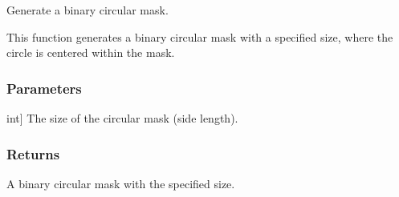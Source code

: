 \documentclass[letterpaper,10pt,english]{sphinxmanual}
\begin{document}

\begin{fulllineitems}
\label{\detokenize{pycatch/utils/ch_mapping:pycatch.utils.ch_mapping.make_circle}}
\pysigstartsignatures
{}
\pysigstopsignatures
\sphinxAtStartPar
Generate a binary circular mask.

\sphinxAtStartPar
This function generates a binary circular mask with a specified size, where the circle is centered within the mask.


\subsubsection{Parameters}
\label{\detokenize{pycatch/utils/ch_mapping:id23}}\begin{description}
\sphinxlineitem{s}{[}int{]}
\sphinxAtStartPar
The size of the circular mask (side length).

\end{description}


\subsubsection{Returns}
\label{\detokenize{pycatch/utils/ch_mapping:id24}}\begin{description}
\sphinxAtStartPar
A binary circular mask with the specified size.

\end{description}

\end{fulllineitems}

\end{document}
